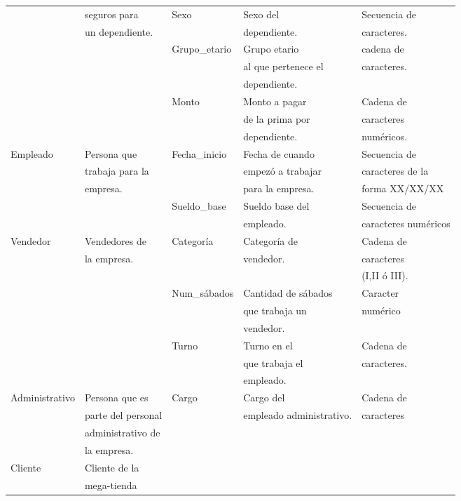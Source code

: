 \documentclass{article}
\begin{document}
\begin{table}[h]
{\begin{tabular}{|l|l|l|l|l|}
 & seguros para & Sexo & Sexo del & Secuencia de \\
 & un dependiente. & & dependiente. & caracteres.\\ \cline{3-5}
 & & Grupo\_etario  & Grupo etario & cadena de \\
 & & & al que pertenece el &caracteres.\\
 & & & dependiente.&\\ \cline{3-5}
 & & Monto & Monto a pagar & Cadena de \\
 & & & de la prima por &caracteres \\
 & & & dependiente. &num\'ericos.\\ \hline
Empleado & Persona que & Fecha\_inicio & Fecha de cuando & Secuencia de \\
 & trabaja para la & & empez\'o a trabajar& caracteres de la \\
 & empresa. & & para la empresa. & forma XX/XX/XX\\ \cline{3-5}
 & & Sueldo\_base & Sueldo base del & Secuencia de \\
 & & & empleado.& caracteres num\'ericos \\ \hline
Vendedor & Vendedores de & Categor\'ia & Categor\'ia de & Cadena de \\
 & la empresa. & & vendedor. & caracteres \\
 & & & & (I,II \'o III).\\ \cline{3-5}
 & &Num\_s\'abados & Cantidad de s\'abados & Caracter \\
 & & & que trabaja un & num\'erico\\
 & & & vendedor.&\\ \cline{3-5}
 & &Turno & Turno en el & Cadena de \\
 & & &que trabaja el  & caracteres.\\
 & & & empleado.&\\ \hline
 Administrativo&Persona que es & Cargo& Cargo del & Cadena de \\
 & parte del personal & & empleado administrativo. & caracteres\\
 & administrativo de& & &\\
 & la empresa.& & &\\ \hline
Cliente & Cliente de la& & &\\
 & mega-tienda& & &\\ \hline

\end{tabular}}
\end{table}
\end{document}
